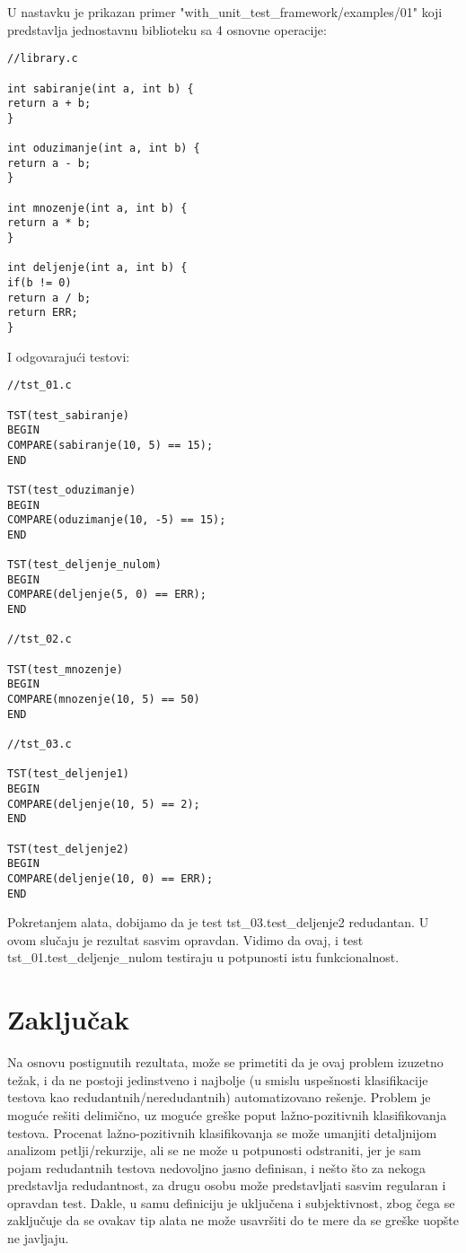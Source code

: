 \documentclass[a4paper]{article}
\begin{document}
U nastavku je prikazan primer "with\_unit\_test\_framework/examples/01" koji predstavlja jednostavnu biblioteku sa 4 osnovne operacije:

\begin{lstlisting}
//library.c

int sabiranje(int a, int b) {
return a + b;
}

int oduzimanje(int a, int b) {
return a - b;
}

int mnozenje(int a, int b) {
return a * b;
}

int deljenje(int a, int b) {
if(b != 0)
return a / b;
return ERR;
}
\end{lstlisting}

I odgovarajući testovi:

\begin{lstlisting}
//tst_01.c

TST(test_sabiranje)
BEGIN
COMPARE(sabiranje(10, 5) == 15);
END

TST(test_oduzimanje)
BEGIN
COMPARE(oduzimanje(10, -5) == 15);
END

TST(test_deljenje_nulom)
BEGIN
COMPARE(deljenje(5, 0) == ERR);
END

//tst_02.c

TST(test_mnozenje)
BEGIN
COMPARE(mnozenje(10, 5) == 50)
END

//tst_03.c

TST(test_deljenje1)
BEGIN
COMPARE(deljenje(10, 5) == 2);
END

TST(test_deljenje2)
BEGIN
COMPARE(deljenje(10, 0) == ERR);
END
\end{lstlisting}

Pokretanjem alata, dobijamo da je test tst\_03.test\_deljenje2 redudantan. U ovom slučaju je rezultat sasvim opravdan. Vidimo da ovaj, i test tst\_01.test\_deljenje\_nulom testiraju u potpunosti istu funkcionalnost.

\section{Zaključak}
\label{sec:zakljucak}
Na osnovu postignutih rezultata, može se primetiti da je ovaj problem izuzetno težak, i da ne postoji jedinstveno i najbolje (u smislu uspešnosti klasifikacije testova kao redudantnih/neredudantnih) automatizovano rešenje. Problem je moguće rešiti delimično, uz moguće greške poput lažno-pozitivnih klasifikovanja testova. Procenat lažno-pozitivnih klasifikovanja se može umanjiti detaljnijom analizom petlji/rekurzije, ali se ne može u potpunosti odstraniti, jer je sam pojam redudantnih testova nedovoljno jasno definisan, i nešto što za nekoga predstavlja redudantnost, za drugu osobu može predstavljati sasvim regularan i opravdan test. Dakle, u samu definiciju je uključena i subjektivnost, zbog čega se zaključuje da se ovakav tip alata ne može usavršiti do te mere da se greške uopšte ne javljaju.
\end{document}
